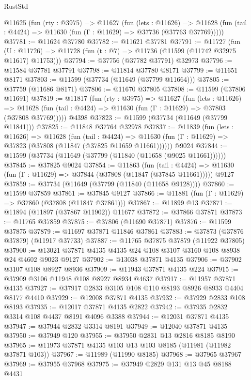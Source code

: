 \begin{lexlean}{RustStd}
\begin{coremodule}
  @11625
    (fun (rty : @3975) =>
    @11627
      (fun (lets : @11626) =>
      @11628 (fun (tail : @4424) => @11630 (fun (Γ : @11629) => @37736 (@37763 @37769)))))
@37781 := @11624 @37780
@37782 := @11621 @37781
@37791 := @11727
    (fun (U : @11726) => @11728 (fun (t : @7) => @11736 (@11599 (@11742 @32975 @11617) @11753)))
@37794 := @37756 (@37782 @37791) @32973
@37796 := @11584 @37781 @37791
@37798 := @11814 @37780 @8171
@37799 := @11651 @8171
@37803 := @11599 (@37734 (@11649 (@37799 @11664)))
@37805 := @37759 (@11686 @8171)
@37806 := @11670 @37805
@37808 := @11599 (@37806 @11691)
@37819 := @11817
    (fun (rty : @3975) =>
    @11627
      (fun (lets : @11626) =>
      @11628 (fun (tail : @4424) => @11630 (fun (Γ : @11629) => @37803 (@37808 @37769)))))
    @4398
@37823 := @11599 (@37734 (@11649 (@37799 @11841)))
@37825 := @11848 @37764 @32978
@37837 := @11839
    (fun (lets : @11626) =>
    @11628
      (fun (tail : @4424) =>
      @11630 (fun (Γ : @11629) => @37823 (@37808 (@11847 (@37825 @11659 @11661))))))
    @9024
@37844 := @11599 (@37734 (@11649 (@37799 (@11840 (@11658 (@9025 @11661))))))
@37845 := @37825 @9024
@37854 := @11863
    (fun (tail : @4424) => @11630 (fun (Γ : @11629) => @37844 (@37808 (@11847 (@37845 @11661)))))
    @9127
@37859 := @37734 (@11649 (@37799 (@11840 (@11658 @9128))))
@37860 := @11599 @37859
@37861 := @37845 @9127
@37866 := @11881 (fun (Γ : @11629) => @37860 (@37808 (@11847 @37861)))
@37867 := @11899 @13
@37871 := @11894 (@11897 (@37867 @11902)) @11677
@37872 := @37866 @37871
@37873 := @11765 @37859
@37875 := @37806 (@11690 @37871)
@37876 := @11599 @37875
@37879 := @11697 @37871 @11846 @37861
@37883 := @37873 (@37876 @37879) (@11917 @37733)
@37887 := @11765 @37875 @37879 (@11922 @37805)
@37900 := @13021 @37871 @4135 @4135 @24 @108 @3107 @3160 @108 @8938 @24 @4602 @9023 @9127
@37902 := @13038 @37871 @4135
@37906 := @37902 @3107 @108 @8927 @8936
@37909 := @11943 @37871 @4135 @224
@37915 := @37909 @3106 @11948 @108 @8927 @8934 @4637
@37917 := @11957 @37871 @4135
@37927 := @37917 @2833 @3105 @108 @110 @8193 @8926 @8933 @4404 @8177 @4410
@37929 := @12008 @37871 @4135
@37932 := @37929 @2833 @108 @8193
@37935 := @12017 @37871 @4135 @2822
@37942 := @37935 @2832 @3314 @108 @4437 @8191 @4096 @3388
@37944 := @12031 @37871 @4135
@37947 := @37944 @2832 @3314 @8191
@37949 := @12040 @37871 @4135
@37950 := @37949 @120
@37955 := @37950 @2831 @13 @2816 @8185 @8190
@37965 := @11973 @37871 @4135 @103 @13 @103 @8185 (@11981 (@11982 @37871 @103))
@37967 := @11989 (@11990 @8185)
@37968 := @37965 @37967
@37969 := @37955 @37968
@37975 := @37949 @2829 @131 @13 @45 @8188 @4431

\end{coremodule}
\end{lexlean}
